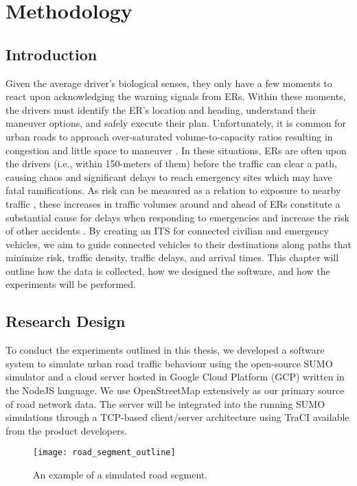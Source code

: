 \chapter{Methodology}


\section{Introduction}
		Given the average driver's biological senses, they only have a few moments to react upon acknowledging the warning signals from ERs. Within these moments, the drivers must identify the ER's location and heading, understand their maneuver options, and safely execute their plan. Unfortunately, it is common for urban roads to approach over-saturated volume-to-capacity ratios resulting in congestion and little space to maneuver \cite{archer_2005, traffic_data_computation_method_2018}. In these situations, ERs are often upon the drivers (i.e., within 150-meters of them) before the traffic can clear a path, causing chaos and significant delays to reach emergency sites which may have fatal ramifications. As risk can be measured as a relation to exposure to nearby traffic \cite{archer_2005, traffic_data_computation_method_2018}, these increases in traffic volumes around and ahead of ERs constitute a substantial cause for delays when responding to emergencies and increase the risk of other accidents \cite{Hsiao2018, Buchenscheit2009, Vlad2008, Sukru2020}. By creating an ITS for connected civilian and emergency vehicles, we aim to guide connected vehicles to their destinations along paths that minimize risk, traffic density, traffic delays, and arrival times. This chapter will outline how the data is collected, how we designed the software, and how the experiments will be performed.


\section{Research Design}
	To conduct the experiments outlined in this thesis, we developed a software system to simulate urban road traffic behaviour using the open-source SUMO simulator and a cloud server hosted in Google Cloud Platform (GCP) written in the NodeJS language. We use OpenStreetMap extensively as our primary source of road network data. The server will be integrated into the running SUMO simulations through a TCP-based client/server architecture using TraCI available from the product developers.
	
	\begin{figure}
		\texttt{[image: road\_segment\_outline]}
		\caption{An example of a simulated road segment.}
		\label{fig:road_segment_outline}
	\end{figure}

